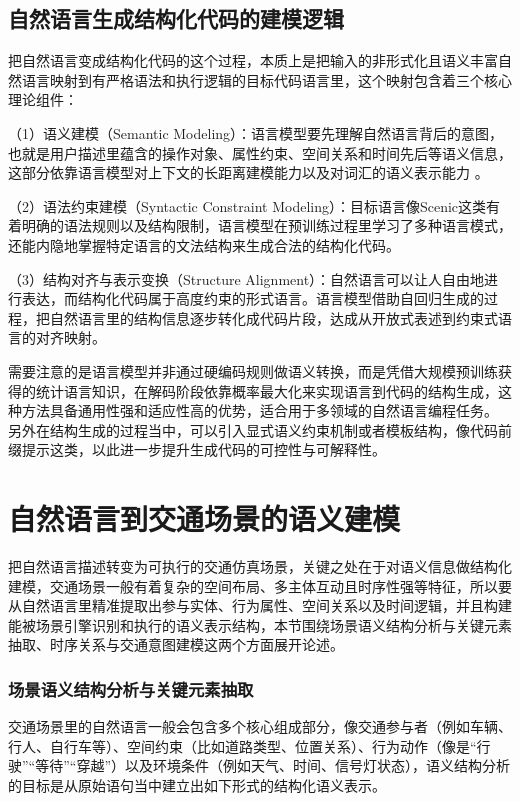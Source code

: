 \subsection{自然语言生成结构化代码的建模逻辑}

把自然语言变成结构化代码的这个过程，本质上是把输入的非形式化且语义丰富自然语言映射到有严格语法和执行逻辑的目标代码语言里，这个映射包含着三个核心理论组件：


（1）语义建模（Semantic Modeling）：语言模型要先理解自然语言背后的意图，也就是用户描述里蕴含的操作对象、属性约束、空间关系和时间先后等语义信息，这部分依靠语言模型对上下文的长距离建模能力以及对词汇的语义表示能力 。

（2）语法约束建模（Syntactic Constraint Modeling）：目标语言像Scenic这类有着明确的语法规则以及结构限制，语言模型在预训练过程里学习了多种语言模式，还能内隐地掌握特定语言的文法结构来生成合法的结构化代码。

（3）结构对齐与表示变换（Structure Alignment）：自然语言可以让人自由地进行表达，而结构化代码属于高度约束的形式语言。语言模型借助自回归生成的过程，把自然语言里的结构信息逐步转化成代码片段，达成从开放式表述到约束式语言的对齐映射。


需要注意的是语言模型并非通过硬编码规则做语义转换，而是凭借大规模预训练获得的统计语言知识，在解码阶段依靠概率最大化来实现语言到代码的结构生成，这种方法具备通用性强和适应性高的优势，适合用于多领域的自然语言编程任务。
另外在结构生成的过程当中，可以引入显式语义约束机制或者模板结构，像代码前缀提示这类，以此进一步提升生成代码的可控性与可解释性。
\section{自然语言到交通场景的语义建模}

把自然语言描述转变为可执行的交通仿真场景，关键之处在于对语义信息做结构化建模，交通场景一般有着复杂的空间布局、多主体互动且时序性强等特征，所以要从自然语言里精准提取出参与实体、行为属性、空间关系以及时间逻辑，并且构建能被场景引擎识别和执行的语义表示结构，本节围绕场景语义结构分析与关键元素抽取、时序关系与交通意图建模这两个方面展开论述。

\subsubsection{场景语义结构分析与关键元素抽取}

交通场景里的自然语言一般会包含多个核心组成部分，像交通参与者（例如车辆、行人、自行车等）、空间约束（比如道路类型、位置关系）、行为动作（像是“行驶”“等待”“穿越”）以及环境条件（例如天气、时间、信号灯状态），语义结构分析的目标是从原始语句当中建立出如下形式的结构化语义表示。

